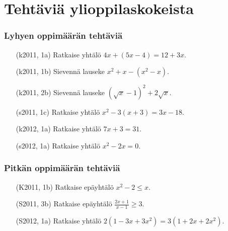 \section{Tehtäviä ylioppilaskokeista}

\subsubsection*{Lyhyen oppimäärän tehtäviä}

\begin{itemize}
  \item[(k2011, 1a)] Ratkaise yhtälö $4x+(5x-4) = 12+3x$.
  \item[(k2011, 1b)] Sievennä lauseke $x^2+x-(x^2-x)$.
  \item[(k2011, 2b)] Sievennä lauseke $(\sqrt{x}-1)^2+2\sqrt{x}$.
  \item[(s2011, 1c)] Ratkaise yhtälö $x^2-3(x+3) = 3x-18$.
  \item[(k2012, 1a)] Ratkaise yhtälö $7x+3 = 31$.
  \item[(s2012, 1a)] Ratkaise yhtälö $x^2-2x = 0$.
\end{itemize}

\subsubsection*{Pitkän oppimäärän tehtäviä}

\begin{itemize}
  \item[(K2011, 1b)] Ratkaise epäyhtälö $x^2-2 \leq x$.
  \item[(S2011, 3b)] Ratkaise epäyhtälö $\frac{2x+1}{x-1} \geq 3$.
  \item[(S2012, 1a)] Ratkaise yhtälö $2(1-3x+3x^2) = 3(1+2x+2x^2)$.
\end{itemize}





